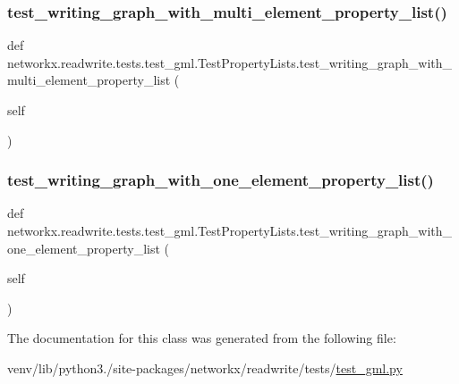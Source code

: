 \subsubsection{\texorpdfstring{test\+\_\+writing\+\_\+graph\+\_\+with\+\_\+multi\+\_\+element\+\_\+property\+\_\+list()}{test\_writing\_graph\_with\_multi\_element\_property\_list()}}
{\footnotesize\ttfamily def networkx.\+readwrite.\+tests.\+test\+\_\+gml.\+Test\+Property\+Lists.\+test\+\_\+writing\+\_\+graph\+\_\+with\+\_\+multi\+\_\+element\+\_\+property\+\_\+list (\begin{DoxyParamCaption}\item[{}]{self }\end{DoxyParamCaption})}

\mbox{\label{classnetworkx_1_1readwrite_1_1tests_1_1test__gml_1_1TestPropertyLists_a93a2c0d305188960672c022aa8001ed0}} 
\subsubsection{\texorpdfstring{test\+\_\+writing\+\_\+graph\+\_\+with\+\_\+one\+\_\+element\+\_\+property\+\_\+list()}{test\_writing\_graph\_with\_one\_element\_property\_list()}}
{\footnotesize\ttfamily def networkx.\+readwrite.\+tests.\+test\+\_\+gml.\+Test\+Property\+Lists.\+test\+\_\+writing\+\_\+graph\+\_\+with\+\_\+one\+\_\+element\+\_\+property\+\_\+list (\begin{DoxyParamCaption}\item[{}]{self }\end{DoxyParamCaption})}



The documentation for this class was generated from the following file\+:\begin{DoxyCompactItemize}
\item 
venv/lib/python3./site-\/packages/networkx/readwrite/tests/\hyperlink{test__gml_8py}{test\+\_\+gml.\+py}\end{DoxyCompactItemize}
